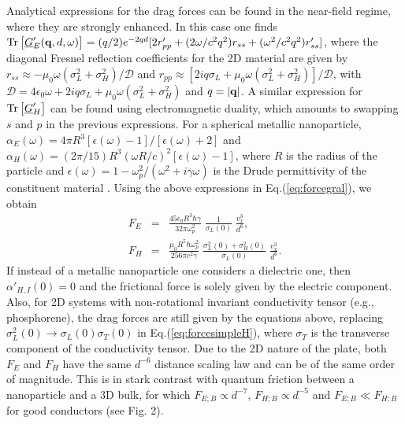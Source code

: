 \documentclass[10pt,aps,prl,superscriptaddress,showpacs,twocolumn]{revtex4-1}
\begin{document}
Analytical expressions for the drag forces can be found in the near-field regime, where they are strongly enhanced.
In this case one finds ${\rm Tr} \left[\underline{G}'_E({\bf q},d,\omega) \right] =  (q/2) e^{-2 q d} [2 r'_{pp}+ (2 \omega/c^2 q^2) r_{ss} + (\omega^2/c^2 q^2)  r'_{ss}]$, where
the diagonal Fresnel reflection coefficients for the 2D material are given by 
$r_{ss} \approx  - \mu_0 \omega (\sigma_{L}^2+\sigma_{H}^2)/\mathcal{D}$ and 
$r_{pp} \approx [ 2 i q \sigma_{L} +  \mu_0 \omega (\sigma_{L}^2+\sigma_{H}^2) ] / \mathcal{D}$, with 
$\mathcal{D}= 4  \epsilon_0 \omega  + 2i q \sigma_{L}  +  \mu_0 \omega  (\sigma_{L}^2+\sigma_{H}^2)$ \cite{Kort-Kamp2015} and $q=|{\bf q}|$.
 A similar expression for 
${\rm Tr} \left[ \underline{G}'_H \right]$ can be found using electromagnetic duality, which amounts to 
swapping $s$ and $p$ in the previous expressions. For a spherical metallic nanoparticle, 
$\alpha_E(\omega)= 4 \pi R^3 [\epsilon(\omega)-1]/[\epsilon(\omega)+2]$ and $\alpha_H(\omega)= (2 \pi/15)  R^3 (\omega R/c)^2 [\epsilon(\omega)-1]$,
where $R$ is the radius of the particle and $\epsilon(\omega)=1-\omega_p^2/(\omega^2 + i \gamma \omega)$ is the Drude permittivity of  the constituent material  \cite{Bohren}. Using the above expressions in Eq.(\ref{eq:forcegral}), we obtain
%
\begin{eqnarray}
F_{E} &=&  \frac{45 \epsilon_0  R^3 \hbar \gamma}
{32 \pi \omega_p^2 }  \; \frac{1}{\sigma_{L}(0)} \; \frac{v_x^3}{d^6}, 
\label{eq:forcesimpleE}
\\
F_{H} &=& \frac{\mu_0 R^5 \hbar \omega_p^2}
{256 \pi c^2 \gamma} \; \frac{\sigma_{L}^2(0)+\sigma_{H}^2(0)}{\sigma_{L}(0)}  \; \frac{v_x^3}{d^6}.
\label{eq:forcesimpleH}
\end{eqnarray}
If instead of a metallic nanoparticle one considers a dielectric one, then $\alpha'_{H,I}(0)=0$ and the frictional force is solely given by the electric component. Also, for 2D systems with non-rotational invariant conductivity tensor (e.g., phosphorene), the drag forces are still given by the equations above, replacing $\sigma_L^2(0) \rightarrow \sigma_L(0) \sigma_T(0)$ in Eq.(\ref{eq:forcesimpleH}), where $\sigma_T$ is the transverse component of the conductivity tensor. 
Due to the 2D nature of the plate, 
both $F_E$ and $F_H$ have the same $d^{-6}$ distance scaling law and 
can be of the same order of magnitude. This is in stark contrast with quantum friction
between a nanoparticle and a 3D bulk, for which $F_{E;B} \propto d^{-7}$,
$F_{H;B} \propto d^{-5}$ and $F_{E;B} \ll F_{H;B}$ for good conductors \cite{Bulk} (see Fig. 2). 
\end{document}
